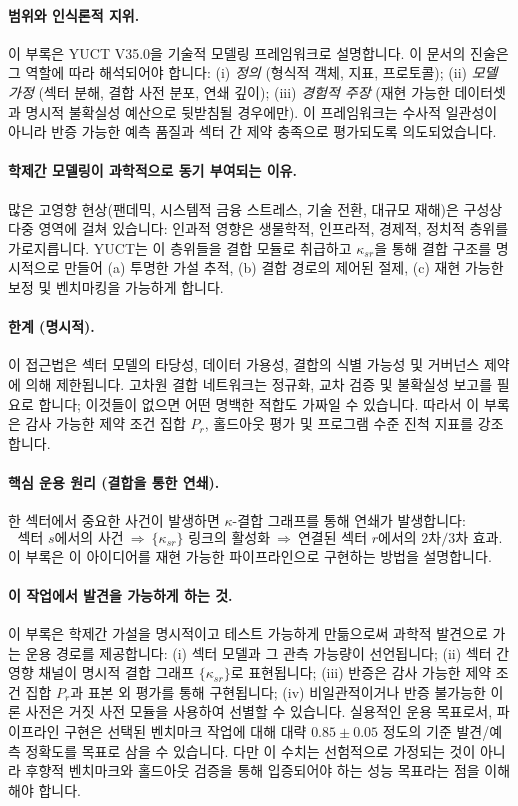 \documentclass[13pt,a4paper]{article}
\begin{document}
	\paragraph{범위와 인식론적 지위.}
	이 부록은 YUCT V35.0을 기술적 모델링 프레임워크로 설명합니다. 이 문서의 진술은 그 역할에 따라 해석되어야 합니다:
	(i) \emph{정의} (형식적 객체, 지표, 프로토콜);
	(ii) \emph{모델 가정} (섹터 분해, 결합 사전 분포, 연쇄 깊이);
	(iii) \emph{경험적 주장} (재현 가능한 데이터셋과 명시적 불확실성 예산으로 뒷받침될 경우에만).
	이 프레임워크는 수사적 일관성이 아니라 반증 가능한 예측 품질과 섹터 간 제약 충족으로 평가되도록 의도되었습니다.
	
	\paragraph{학제간 모델링이 과학적으로 동기 부여되는 이유.}
	많은 고영향 현상(팬데믹, 시스템적 금융 스트레스, 기술 전환, 대규모 재해)은 구성상 다중 영역에 걸쳐 있습니다: 인과적 영향은 생물학적, 인프라적, 경제적, 정치적 층위를 가로지릅니다. YUCT는 이 층위들을 결합 모듈로 취급하고 $\kappa_{sr}$을 통해 결합 구조를 명시적으로 만들어 (a) 투명한 가설 추적, (b) 결합 경로의 제어된 절제, (c) 재현 가능한 보정 및 벤치마킹을 가능하게 합니다.
	
	\paragraph{한계 (명시적).}
	이 접근법은 섹터 모델의 타당성, 데이터 가용성, 결합의 식별 가능성 및 거버넌스 제약에 의해 제한됩니다. 고차원 결합 네트워크는 정규화, 교차 검증 및 불확실성 보고를 필요로 합니다; 이것들이 없으면 어떤 명백한 적합도 가짜일 수 있습니다. 따라서 이 부록은 감사 가능한 제약 조건 집합 $P_r$, 홀드아웃 평가 및 프로그램 수준 진척 지표를 강조합니다.
	
	\paragraph{핵심 운용 원리 (결합을 통한 연쇄).}
	한 섹터에서 중요한 사건이 발생하면 $\kappa$-결합 그래프를 통해 연쇄가 발생합니다:
	\[
	\text{섹터 }s \text{에서의 사건} \ \Rightarrow\ \{\kappa_{sr}\} \text{ 링크의 활성화}\ \Rightarrow\ \text{연결된 섹터 }r \text{에서의 2차/3차 효과}.
	\]
	이 부록은 이 아이디어를 재현 가능한 파이프라인으로 구현하는 방법을 설명합니다.
	
	\paragraph{이 작업에서 발견을 가능하게 하는 것.}
	이 부록은 학제간 가설을 명시적이고 테스트 가능하게 만듦으로써 과학적 발견으로 가는 운용 경로를 제공합니다: (i) 섹터 모델과 그 관측 가능량이 선언됩니다; (ii) 섹터 간 영향 채널이 명시적 결합 그래프 $\{\kappa_{sr}\}$로 표현됩니다; (iii) 반증은 감사 가능한 제약 조건 집합 $P_r$과 표본 외 평가를 통해 구현됩니다; (iv) 비일관적이거나 반증 불가능한 이론 사전은 거짓 사전 모듈을 사용하여 선별할 수 있습니다.
	실용적인 운용 목표로서, 파이프라인 구현은 선택된 벤치마크 작업에 대해 대략 $0.85\pm0.05$ 정도의 기준 발견/예측 정확도를 목표로 삼을 수 있습니다. 다만 이 수치는 선험적으로 가정되는 것이 아니라 후향적 벤치마크와 홀드아웃 검증을 통해 입증되어야 하는 성능 목표라는 점을 이해해야 합니다.
	
\end{document}
